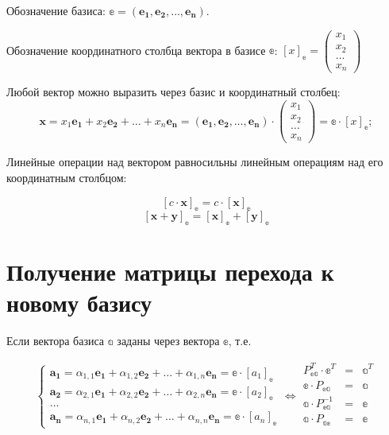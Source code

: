 Обозначение базиса: $\mathbb{e} = (\boldsymbol{e_1}, \boldsymbol{e_2}, \dots, \boldsymbol{e_n})$.

Обозначение координатного столбца вектора в базисе $\mathbb{e}$: $[x]_\mathbb{e} = 
\begin{pmatrix}
	x_1\\
	x_2\\
	\dots\\
	x_n
\end{pmatrix} $  

Любой вектор можно выразить через базис и координатный столбец: 
$$
	\boldsymbol{x} = x_1\boldsymbol{e_1} + x_2\boldsymbol{e_2} + \dots + x_n\boldsymbol{e_n} = (\boldsymbol{e_1}, \boldsymbol{e_2}, \dots, \boldsymbol{e_n}) \cdot 
	\begin{pmatrix}
		x_1\\
		x_2\\
		\dots\\
		x_n
	\end{pmatrix} = \mathbb{e}\cdot [x]_\mathbb{e}; 
$$

Линейные операции над вектором равносильны линейным операциям над его координатным столбцом:

$$ [c\cdot \boldsymbol{x}]_\mathbb{e} = c\cdot [\boldsymbol{x}]_\mathbb{e} $$
$$ [\boldsymbol{x} + \boldsymbol{y}]_\mathbb{e} = [\boldsymbol{x}]_\mathbb{e} + [\boldsymbol{y}]_\mathbb{e} $$

\section{Получение матрицы перехода к новому базису}

Если вектора базиса $\mathbb{a}$ заданы через вектора $\mathbb{e}$, т.е.

\begin{equation*} 
	\begin{cases}
		\boldsymbol{a_1} = \alpha_{1,1}\boldsymbol{e_1} + \alpha_{1,2}\boldsymbol{e_2} + \dots + \alpha_{1,n}\boldsymbol{e_n} = \mathbb{e} \cdot [a_1]_\mathbb{e} \\
		\boldsymbol{a_2} = \alpha_{2,1}\boldsymbol{e_1} + \alpha_{2,2}\boldsymbol{e_2} + \dots + \alpha_{2,n}\boldsymbol{e_n} = \mathbb{e} \cdot [a_2]_\mathbb{e} \\
		\dots \\
		\boldsymbol{a_n} = \alpha_{n,1}\boldsymbol{e_1} + \alpha_{n,2}\boldsymbol{e_2} + \dots + \alpha_{n,n}\boldsymbol{e_n} = \mathbb{e} \cdot [a_n]_\mathbb{e}
	\end{cases}
	\Leftrightarrow
	\begin{matrix}
		P_\mathbb{ea}^T \cdot \mathbb{e}^T& =& \mathbb{a}^T \\
		\mathbb{e} \cdot P_\mathbb{ea}& =& \mathbb{a}\\
		\mathbb{a} \cdot P_\mathbb{ea}^{-1}& =& \mathbb{e}\\
		\mathbb{a} \cdot P_\mathbb{ae}& =& \mathbb{e}\\
	\end{matrix}
\end{equation*} 

